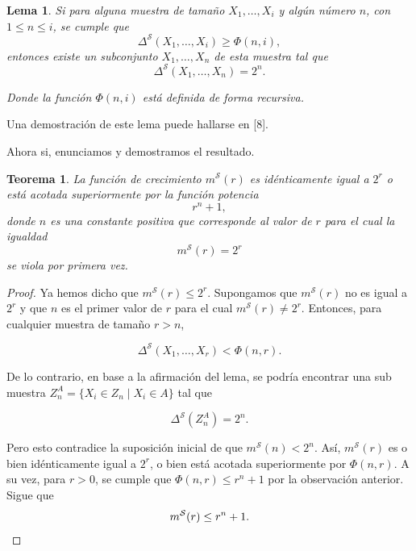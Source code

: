 \documentclass{report}
\newtheorem{thm}{Teorema}[subsection]
\newtheorem{lem}{Lema}[subsection]
\begin{document}
\begin{lem}
Si para alguna muestra de tamaño \( X_1, \dots, X_i \) y algún número \( n \), con \( 1 \leq n \leq i \),  
se cumple que  
\[
\Delta^{\mathcal{S}}(X_1, \dots, X_i) \geq \Phi(n, i),
\]  
entonces existe un subconjunto \( X_1, \dots, X_n \) de esta muestra tal que  
\[
\Delta^{\mathcal{S}}(X_1, \dots, X_n) = 2^n.
\]  

Donde la función \( \Phi(n, i) \) está definida de forma recursiva.  
\end{lem}

Una demostración de este lema puede hallarse en [8].\newline

Ahora si, enunciamos y demostramos el resultado.\newline

\begin{thm} \label{teo: cota polinomica de la función de crecimiento}
    La función de crecimiento \( m^{\mathcal{S}}(r) \) es idénticamente igual a \( 2^r \) o está acotada superiormente por la función potencia  
    \[
    r^n + 1,
    \]
    donde \( n \) es una constante positiva que corresponde al valor de \( r \) para el cual la igualdad  
    \[
    m^{\mathcal{S}}(r) = 2^r
    \]
    se viola por primera vez.    
\end{thm}

\begin{proof}
Ya hemos dicho que \( m^{\mathcal{S}}(r) \leq 2^r \). Supongamos que \( m^{\mathcal{S}}(r) \) no es 
 igual a \( 2^r \) y que \( n \) es el primer valor de \( r \) para el cual \( m^{\mathcal{S}}(r) \neq 2^r \). 
    Entonces, para cualquier muestra de tamaño \( r > n \),
    
    \[
    \Delta^{\mathcal{S}}(X_1, \dots, X_r) < \Phi(n, r).
    \]
    
    De lo contrario, en base a la afirmación del lema, se podría encontrar una sub muestra  
    \( Z_n^A = \{X_i \in Z_n \mid X_i \in A\} \) tal que  
    
    \[
    \Delta^{\mathcal{S}}\left(Z_n^A\right) = 2^n.
    \]
    
  Pero esto contradice la suposición inicial de que \( m^{\mathcal{S}}(n) < 2^n \).  
    Así, \( m^{\mathcal{S}}(r) \) es o bien idénticamente igual a \( 2^r \), o bien está acotada superiormente 
    por \( \Phi(n, r) \). A su vez, para \( r > 0 \), se cumple que \( \Phi(n, r) \leq r^n + 1 \) por la observación
    anterior. Sigue que 
    \[
        m^{\mathcal{S}}(r)   \leq r^n + 1.\newline
    \]
    
\end{proof}
\end{document}
